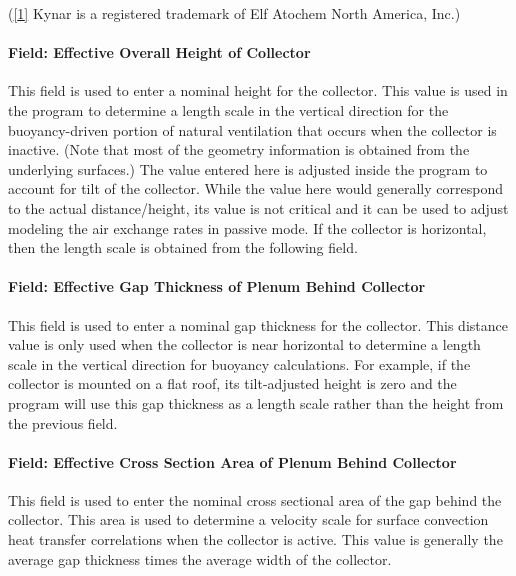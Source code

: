 (\protect\hyperlink{ux5fftnref1}{{[}1{]}} Kynar is a registered trademark of Elf Atochem North America, Inc.)

\paragraph{Field: Effective Overall Height of Collector}\label{field-effective-overall-height-of-collector}

This field is used to enter a nominal height for the collector. This value is used in the program to determine a length scale in the vertical direction for the buoyancy-driven portion of natural ventilation that occurs when the collector is inactive. (Note that most of the geometry information is obtained from the underlying surfaces.) The value entered here is adjusted inside the program to account for tilt of the collector. While the value here would generally correspond to the actual distance/height, its value is not critical and it can be used to adjust modeling the air exchange rates in passive mode. If the collector is horizontal, then the length scale is obtained from the following field.

\paragraph{Field: Effective Gap Thickness of Plenum Behind Collector}\label{field-effective-gap-thickness-of-plenum-behind-collector}

This field is used to enter a nominal gap thickness for the collector. This distance value is only used when the collector is near horizontal to determine a length scale in the vertical direction for buoyancy calculations. For example, if the collector is mounted on a flat roof, its tilt-adjusted height is zero and the program will use this gap thickness as a length scale rather than the height from the previous field.

\paragraph{Field: Effective Cross Section Area of Plenum Behind Collector}\label{field-effective-cross-section-area-of-plenum-behind-collector}

This field is used to enter the nominal cross sectional area of the gap behind the collector. This area is used to determine a velocity scale for surface convection heat transfer correlations when the collector is active. This value is generally the average gap thickness times the average width of the collector.

